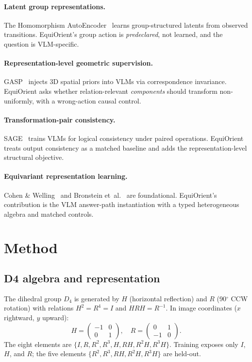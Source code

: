 \documentclass[10pt,twocolumn,letterpaper]{article}
\begin{document}
\paragraph{Latent group representations.}
The Homomorphism AutoEncoder~\cite{keurti2023hae} learns group-structured
latents from observed transitions. EquiOrient's group action is
\emph{predeclared}, not learned, and the question is VLM-specific.

\paragraph{Representation-level geometric supervision.}
GASP~\cite{yeh2026gasp} injects 3D spatial priors into VLMs via
correspondence invariance. EquiOrient asks whether relation-relevant
\emph{components} should transform non-uniformly, with a wrong-action
causal control.

\paragraph{Transformation-pair consistency.}
SAGE~\cite{sage2026} trains VLMs for logical consistency under paired
operations. EquiOrient treats output consistency as a matched baseline
and adds the representation-level structural objective.

\paragraph{Equivariant representation learning.}
Cohen \& Welling~\cite{cohen2016} and Bronstein
et~al.~\cite{bronstein2021} are foundational. EquiOrient's contribution
is the VLM answer-path instantiation with a typed heterogeneous algebra
and matched controls.

\section{Method}
\label{sec:method}

\subsection{D4 algebra and representation}

The dihedral group $D_4$ is generated by $H$ (horizontal reflection)
and $R$ (90$^\circ$ CCW rotation) with relations $H^2 = R^4 = I$ and
$HRH = R^{-1}$. In image coordinates ($x$ rightward, $y$ upward):
\[
H = \begin{pmatrix} -1 & 0 \\ 0 & 1 \end{pmatrix}, \quad
R = \begin{pmatrix} 0 & 1 \\ -1 & 0 \end{pmatrix}.
\]
The eight elements are $\{I, R, R^2, R^3, H, RH, R^2H, R^3H\}$.
Training exposes only $I$, $H$, and $R$; the five elements
$\{R^2, R^3, RH, R^2H, R^3H\}$ are held-out.
\end{document}
